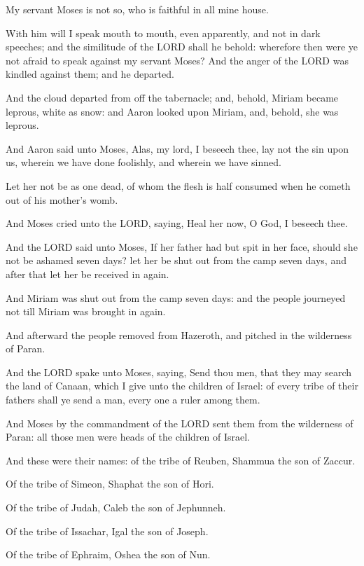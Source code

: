 \Verse My servant Moses is not so, who is faithful in all mine house.

\Verse With him will I speak mouth to mouth, even apparently, and not in
dark speeches; and the similitude of the LORD shall he behold:
wherefore then were ye not afraid to speak against my servant Moses?
\Verse And the anger of the LORD was kindled against them; and he
departed.

\Verse And the cloud departed from off the tabernacle; and, behold,
Miriam became leprous, white as snow: and Aaron looked upon Miriam,
and, behold, she was leprous.

\Verse And Aaron said unto Moses, Alas, my lord, I beseech thee, lay
not the sin upon us, wherein we have done foolishly, and wherein we
have sinned.

\Verse Let her not be as one dead, of whom the flesh is half consumed
when he cometh out of his mother's womb.

\Verse And Moses cried unto the LORD, saying, Heal her now, O God, I
beseech thee.

\Verse And the LORD said unto Moses, If her father had but spit in her
face, should she not be ashamed seven days? let her be shut out from
the camp seven days, and after that let her be received in again.

\Verse And Miriam was shut out from the camp seven days: and the people
journeyed not till Miriam was brought in again.

\Verse And afterward the people removed from Hazeroth, and pitched in
the wilderness of Paran.


\Chapter
\Verse And the LORD spake unto Moses, saying, \Verse Send thou men, that
they may search the land of Canaan, which I give unto the children of
Israel: of every tribe of their fathers shall ye send a man, every one
a ruler among them.

\Verse And Moses by the commandment of the LORD sent them from the
wilderness of Paran: all those men were heads of the children of
Israel.

\Verse And these were their names: of the tribe of Reuben, Shammua the
son of Zaccur.

\Verse Of the tribe of Simeon, Shaphat the son of Hori.

\Verse Of the tribe of Judah, Caleb the son of Jephunneh.

\Verse Of the tribe of Issachar, Igal the son of Joseph.

\Verse Of the tribe of Ephraim, Oshea the son of Nun.

